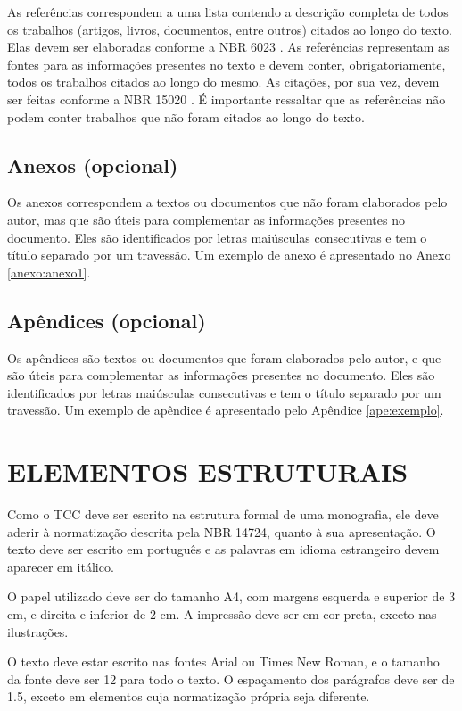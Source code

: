 As referências correspondem a uma lista contendo a descrição completa de todos os trabalhos (artigos, livros, documentos, entre outros) citados ao longo do texto. Elas devem ser elaboradas conforme a NBR 6023 \cite{NBR6023:2002}. As referências representam as fontes para as informações presentes no texto e devem conter, obrigatoriamente, todos os trabalhos citados ao longo do mesmo. As citações, por sua vez,  devem ser feitas conforme a NBR 15020 \cite{NBR10520:2002}. É importante ressaltar que as referências não podem conter trabalhos que não foram citados ao longo do texto.  

\subsection{Anexos (opcional)}

Os anexos correspondem a textos ou documentos que não foram elaborados pelo autor, mas que são úteis para complementar as informações presentes no documento. Eles são identificados por letras maiúsculas consecutivas e tem o título separado por um travessão. Um exemplo de anexo é apresentado no Anexo \ref{anexo:anexo1}.

\subsection{Apêndices (opcional)}

Os apêndices são textos ou documentos que foram elaborados pelo autor, e que são úteis para complementar as informações presentes no documento. Eles são identificados por letras maiúsculas consecutivas e tem o título separado por um travessão. Um exemplo de apêndice é apresentado pelo Apêndice \ref{ape:exemplo}.

\section{ELEMENTOS ESTRUTURAIS}

Como o TCC deve ser escrito na estrutura formal de uma monografia, ele deve aderir à normatização descrita pela NBR 14724, quanto à sua apresentação. O texto deve ser escrito em português e as palavras em idioma estrangeiro devem aparecer em itálico.

O papel utilizado deve ser do tamanho A4, com margens esquerda e superior de 3 cm, e  direita e inferior de 2 cm. A impressão deve ser em cor preta, exceto nas ilustrações.

O texto deve estar escrito nas fontes Arial ou Times New Roman, e o tamanho da fonte deve ser 12 para todo o texto. O espaçamento dos parágrafos deve ser de 1.5, exceto em elementos cuja normatização própria seja diferente.


